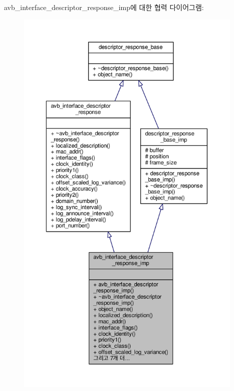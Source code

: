 avb\+\_\+interface\+\_\+descriptor\+\_\+response\+\_\+imp에 대한 협력 다이어그램\+:
\nopagebreak
\begin{figure}[H]
\begin{center}
\leavevmode
\includegraphics[height=550pt]{classavdecc__lib_1_1avb__interface__descriptor__response__imp__coll__graph}
\end{center}
\end{figure}
